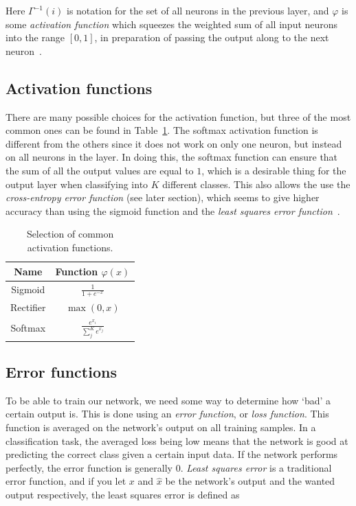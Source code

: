 \documentclass{kththesis}
\renewcommand{\arraystretch}{1.2}
\begin{document}
Here $\Gamma^{-1}(i)$ is notation for the set of all neurons in the previous layer, and $\varphi$ is some \textit{activation function} which squeezes the weighted sum of all input neurons into the range $[0, 1]$, in preparation of passing the output along to the next neuron~\cite{mlfIntro}.

\subsection{Activation functions}
There are many possible choices for the activation function, but three of the most common ones can be found in Table~\ref{tab:activation_functions}. The softmax activation function is different from the others since it does not work on only one neuron, but instead on all neurons in the layer. In doing this, the softmax function can ensure that the sum of all the output values are equal to $1$, which is a desirable thing for the output layer when classifying into $K$ different classes. This also allows the use the \textit{cross-entropy error function} (see later section), which seems to give higher accuracy than using the sigmoid function and the \textit{least squares error function}~\cite{dunne1997pairing}.

\begin{table}[h]
  \renewcommand{\arraystretch}{1.2}
  \begin{center}
    \caption{Selection of common activation functions.}
    \label{tab:activation_functions}
    \begin{tabular}{cc}
      \textbf{Name} & \textbf{Function} $\varphi(x)$\\
      \toprule
      Sigmoid & $\displaystyle \frac{1}{1 + e^{-x}} $ \\[4mm]
      Rectifier & $\displaystyle \max(0, x)$ \\[3mm]
      Softmax & $\displaystyle \frac{e^{x_i}}{\sum_j^K{e^{x_j}}}$ \\
    \end{tabular}
  \end{center}
\end{table}

\subsection{Error functions}
To be able to train our network, we need some way to determine how `bad' a certain output is. This is done using an \textit{error function}, or \textit{loss function}. This function is averaged on the network's output on all training samples. In a classification task, the averaged loss being low means that the network is good at predicting the correct class given a certain input data. If the network performs perfectly, the error function is generally $0$. \textit{Least squares error} is a traditional error function, and if you let $x$ and $\hat{x}$ be the network's output and the wanted output respectively, the least squares error is defined as~\cite{mlfIntro}
\end{document}
